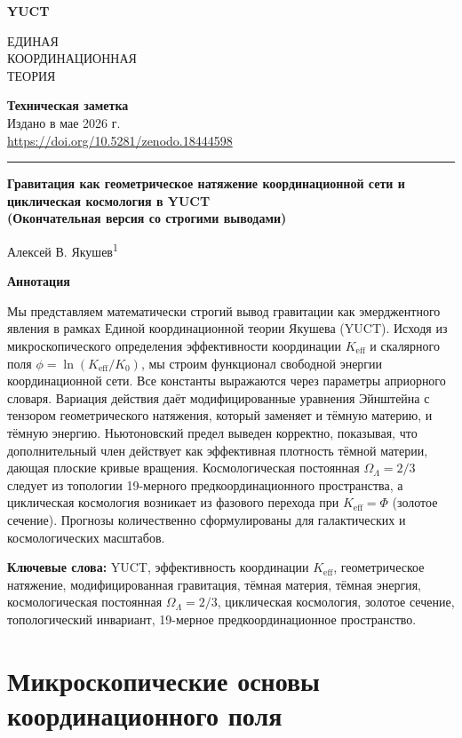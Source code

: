 \documentclass[12pt,a4paper]{article}
\newcommand{\makeheader}{%
	\noindent
	\begin{minipage}{0.17\textwidth}
		\raggedright
		{\sffamily\bfseries\color{skyblue}\fontsize{46}{46}\selectfont YUCT}%
	\end{minipage}%
	\hspace{30pt}
	\begin{minipage}{0.32\textwidth}
		\raggedright
		{\sffamily\fontsize{11}{13}\selectfont ЕДИНАЯ\\ КООРДИНАЦИОННАЯ\\ ТЕОРИЯ}%
	\end{minipage}%
	\hfill
	\begin{minipage}{0.38\textwidth}
		\raggedleft
		{\sffamily\bfseries Техническая заметка}\\ 
		{\sffamily Издано в мае 2026 г.}\\ 
		{\sffamily\footnotesize \scriptsize\url{https://doi.org/10.5281/zenodo.18444598}}%
	\end{minipage}
	\par\vspace{5pt}
	\noindent\textcolor{gold}{\rule{\textwidth}{1.6pt}}
	\par\vspace{0pt}
}
\begin{document}
	\thispagestyle{firstpage}
	\makeheader
	
	\vspace{0cm}
	{\LARGE\bfseries Гравитация как геометрическое натяжение координационной сети и циклическая космология в YUCT\\
		(Окончательная версия со строгими выводами)\par}
	\vspace{0.2cm}
	
	{\large Алексей В. Якушев\textsuperscript{1}} \\
	\vspace{0.0cm}
	
	{\color{darkblue}\textbf{\LARGE Аннотация}} \par
	{\large
		\noindent
		Мы представляем математически строгий вывод гравитации как эмерджентного явления в рамках Единой координационной теории Якушева (YUCT). Исходя из микроскопического определения эффективности координации \(K_{\mathrm{eff}}\) и скалярного поля \(\phi = \ln (K_{\mathrm{eff}}/K_0)\), мы строим функционал свободной энергии координационной сети. Все константы выражаются через параметры априорного словаря. Вариация действия даёт модифицированные уравнения Эйнштейна с тензором геометрического натяжения, который заменяет и тёмную материю, и тёмную энергию. Ньютоновский предел выведен корректно, показывая, что дополнительный член действует как эффективная плотность тёмной материи, дающая плоские кривые вращения. Космологическая постоянная \(\Omega_\Lambda = 2/3\) следует из топологии 19-мерного предкоординационного пространства, а циклическая космология возникает из фазового перехода при \(K_{\mathrm{eff}} = \Phi\) (золотое сечение). Прогнозы количественно сформулированы для галактических и космологических масштабов.}
	
	\vspace{0.1cm}
	\noindent
	{\color{darkblue}\textbf{Ключевые слова:}} YUCT, эффективность координации \(K_{\mathrm{eff}}\), геометрическое натяжение, модифицированная гравитация, тёмная материя, тёмная энергия, космологическая постоянная \(\Omega_\Lambda=2/3\), циклическая космология, золотое сечение, топологический инвариант, 19-мерное предкоординационное пространство.
	
	\vspace{0.4cm}
	
	\tableofcontents
	
	\section{Микроскопические основы координационного поля}
	
\end{document}
